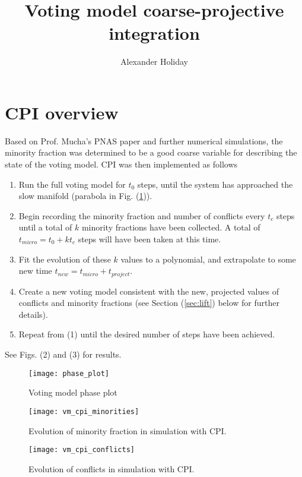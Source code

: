 \documentclass[11pt]{article}
\begin{document}
\title{\vspace{-10mm}Voting model coarse-projective integration}
\author{Alexander Holiday}
\date{}
\maketitle

\section{CPI overview}

Based on Prof. Mucha's PNAS paper and further numerical simulations, the minority fraction was determined to be a good coarse variable for describing the state of the voting model. CPI was then implemented as follows

\begin{enumerate}
\item Run the full voting model for $t_0$ steps, until the system has approached the slow manifold (parabola in Fig. (\ref{fig:pp})).
\item Begin recording the minority fraction and number of conflicts every $t_c$ steps until a total of $k$ minority fractions have been collected. A total of $t_{micro} = t_0 + k t_c$ steps will have been taken at this time.
\item Fit the evolution of these $k$ values to a polynomial, and extrapolate to some new time $t_{new} = t_{micro} + t_{project}$.
\item Create a new voting model consistent with the new, projected values of conflicts and minority fractions (see Section (\ref{sec:lift}) below for further details).
\item Repeat from (1) until the desired number of steps have been achieved.
\end{enumerate}

See Figs. (2) and (3) for results.

\begin{figure}[h!]
  \centering
  \texttt{[image: phase\_plot]}
  \caption{Voting model phase plot}
  \label{fig:pp}
\end{figure}

\begin{figure}[h!]
  \centering
  \texttt{[image: vm\_cpi\_minorities]}
  \caption{Evolution of minority fraction in simulation with CPI.}
  \label{fig:graphA}
\end{figure}

\begin{figure}[h!]
  \centering
  \texttt{[image: vm\_cpi\_conflicts]}
  \caption{Evolution of conflicts in simulation with CPI.}
\end{figure}
\end{document}

